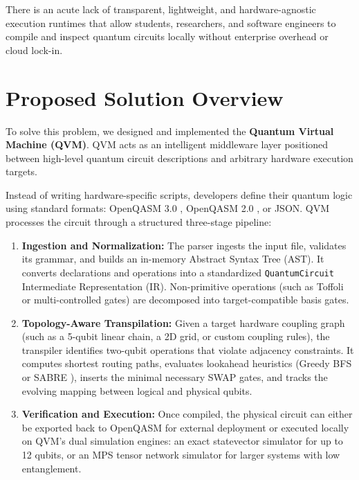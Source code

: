 There is an acute lack of transparent, lightweight, and hardware-agnostic execution runtimes that allow students, researchers, and software engineers to compile and inspect quantum circuits locally without enterprise overhead or cloud lock-in.


\section{Proposed Solution Overview}

To solve this problem, we designed and implemented the \textbf{Quantum Virtual Machine (QVM)}. QVM acts as an intelligent middleware layer positioned between high-level quantum circuit descriptions and arbitrary hardware execution targets.

Instead of writing hardware-specific scripts, developers define their quantum logic using standard formats: OpenQASM 3.0 \cite{cross2022qasm3}, OpenQASM 2.0 \cite{cross2017qasm}, or JSON. QVM processes the circuit through a structured three-stage pipeline:

\begin{enumerate}[leftmargin=*]
    \item \textbf{Ingestion and Normalization:} The parser ingests the input file, validates its grammar, and builds an in-memory Abstract Syntax Tree (AST). It converts declarations and operations into a standardized \texttt{QuantumCircuit} Intermediate Representation (IR). Non-primitive operations (such as Toffoli or multi-controlled gates) are decomposed into target-compatible basis gates.
    \item \textbf{Topology-Aware Transpilation:} Given a target hardware coupling graph (such as a 5-qubit linear chain, a 2D grid, or custom coupling rules), the transpiler identifies two-qubit operations that violate adjacency constraints. It computes shortest routing paths, evaluates lookahead heuristics (Greedy BFS or SABRE \cite{li2019sabre}), inserts the minimal necessary SWAP gates, and tracks the evolving mapping between logical and physical qubits.
    \item \textbf{Verification and Execution:} Once compiled, the physical circuit can either be exported back to OpenQASM for external deployment or executed locally on QVM's dual simulation engines: an exact statevector simulator for up to 12 qubits, or an MPS tensor network simulator for larger systems with low entanglement.
\end{enumerate}

